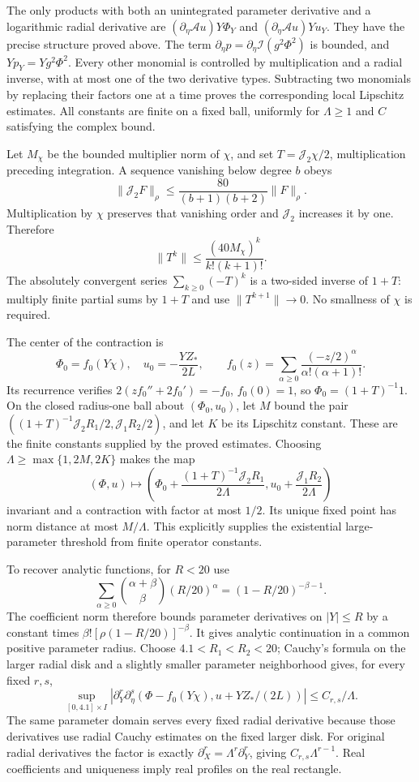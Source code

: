 \documentclass[10pt,a4paper]{article}
\begin{document}
The only products with both an unintegrated parameter derivative and a logarithmic radial derivative are \((\partial_\eta\mathcal A u)Y\Phi_Y\) and \((\partial_\eta\mathcal A u)Yu_Y\). They have the precise structure proved above. The term \(\partial_\eta p=\partial_\eta\mathcal I(g^2\Phi^2)\) is bounded, and \(Yp_Y=Yg^2\Phi^2\). Every other monomial is controlled by multiplication and a radial inverse, with at most one of the two derivative types. Subtracting two monomials by replacing their factors one at a time proves the corresponding local Lipschitz estimates. All constants are finite on a fixed ball, uniformly for \(\Lambda\ge1\) and \(C\) satisfying the complex bound.

Let \(M_\chi\) be the bounded multiplier norm of \(\chi\), and set \(T=\mathcal J_2\chi/2\), multiplication preceding integration. A sequence vanishing below degree \(b\) obeys
\[
\|\mathcal J_2F\|_\rho\le\frac{80}{(b+1)(b+2)}\|F\|_\rho.
\]
Multiplication by \(\chi\) preserves that vanishing order and \(\mathcal J_2\) increases it by one. Therefore
\[
\|T^k\|\le\frac{(40M_\chi)^k}{k!(k+1)!}.
\]
The absolutely convergent series \(\sum_{k\ge0}(-T)^k\) is a two-sided inverse of \(1+T\): multiply finite partial sums by \(1+T\) and use \(\|T^{k+1}\|\to0\). No smallness of \(\chi\) is required.

The center of the contraction is
\[
\Phi_0=f_0(Y\chi),\quad u_0=-\frac{YZ_*}{2L},
\qquad f_0(z)=\sum_{\alpha\ge0}\frac{(-z/2)^\alpha}{\alpha!(\alpha+1)!}.
\]
Its recurrence verifies \(2(zf_0''+2f_0')=-f_0\), \(f_0(0)=1\), so \(\Phi_0=(1+T)^{-1}1\). On the closed radius-one ball about \((\Phi_0,u_0)\), let \(M\) bound the pair
\(((1+T)^{-1}\mathcal J_2R_1/2,\mathcal J_1R_2/2)\), and let \(K\) be its Lipschitz constant. These are the finite constants supplied by the proved estimates. Choosing
\(\Lambda\ge\max\{1,2M,2K\}\) makes the map
\[
(\Phi,u)\longmapsto
\left(\Phi_0+\frac{(1+T)^{-1}\mathcal J_2R_1}{2\Lambda},
u_0+\frac{\mathcal J_1R_2}{2\Lambda}\right)
\]
invariant and a contraction with factor at most \(1/2\). Its unique fixed point has norm distance at most \(M/\Lambda\). This explicitly supplies the existential large-parameter threshold from finite operator constants.

To recover analytic functions, for \(R<20\) use
\[
\sum_{\alpha\ge0}\binom{\alpha+\beta}{\beta}(R/20)^\alpha
=(1-R/20)^{-\beta-1}.
\]
The coefficient norm therefore bounds parameter derivatives on \(|Y|\le R\) by a constant times \(\beta![\rho(1-R/20)]^{-\beta}\). It gives analytic continuation in a common positive parameter radius. Choose \(4.1<R_1<R_2<20\); Cauchy's formula on the larger radial disk and a slightly smaller parameter neighborhood gives, for every fixed \(r,s\),
\[
\sup_{[0,4.1]\times I}
\left|\partial_Y^r\partial_\eta^s(\Phi-f_0(Y\chi),u+YZ_*/(2L))\right|
\le C_{r,s}/\Lambda.
\]
The same parameter domain serves every fixed radial derivative because those derivatives use radial Cauchy estimates on the fixed larger disk. For original radial derivatives the factor is exactly \(\partial_X^r=\Lambda^r\partial_Y^r\), giving \(C_{r,s}\Lambda^{r-1}\). Real coefficients and uniqueness imply real profiles on the real rectangle.
\end{document}
